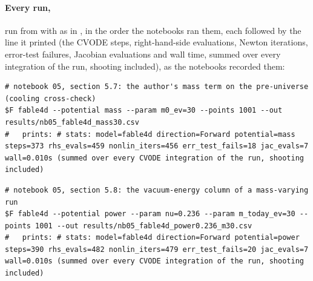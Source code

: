 \paragraph{Every run,} run from  with  as in , in the order the
notebooks ran them, each followed by the  line it printed (the CVODE steps, right-hand-side
evaluations, Newton iterations, error-test failures, Jacobian evaluations and wall time, summed over every
integration of the run, shooting included), as the notebooks recorded them:
\begin{Verbatim}[fontsize=\scriptsize]
# notebook 05, section 5.7: the author's mass term on the pre-universe (cooling cross-check)
$F fable4d --potential mass --param m0_ev=30 --points 1001 --out results/nb05_fable4d_mass30.csv
#   prints: # stats: model=fable4d direction=Forward potential=mass steps=373 rhs_evals=459 nonlin_iters=456 err_test_fails=18 jac_evals=7 wall=0.010s (summed over every CVODE integration of the run, shooting included)
\end{Verbatim}
\begin{Verbatim}[fontsize=\scriptsize]
# notebook 05, section 5.8: the vacuum-energy column of a mass-varying run
$F fable4d --potential power --param nu=0.236 --param m_today_ev=30 --points 1001 --out results/nb05_fable4d_power0.236_m30.csv
#   prints: # stats: model=fable4d direction=Forward potential=power steps=390 rhs_evals=482 nonlin_iters=479 err_test_fails=20 jac_evals=7 wall=0.010s (summed over every CVODE integration of the run, shooting included)
\end{Verbatim}
